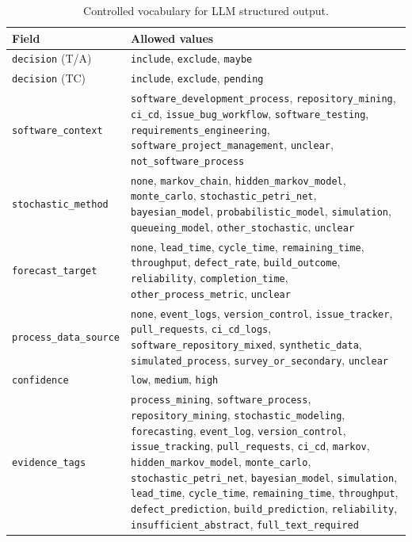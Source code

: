 \begin{table}[htbp]
\centering
\caption{Controlled vocabulary for LLM structured output.}
\label{tab:app-enum-schema}
\small
\setlength{\tabcolsep}{4pt}
\begin{tabular}{p{3.0cm} p{9.6cm}}
\toprule
\textbf{Field} & \textbf{Allowed values} \\
\midrule
\texttt{decision} (T/A) &
  \texttt{include}, \texttt{exclude}, \texttt{maybe} \\
\texttt{decision} (TC) &
  \texttt{include}, \texttt{exclude}, \texttt{pending} \\
\texttt{software\_context} &
  \texttt{software\_development\_process}, \texttt{repository\_mining},
  \texttt{ci\_cd}, \texttt{issue\_bug\_workflow}, \texttt{software\_testing},
  \texttt{requirements\_engineering}, \texttt{software\_project\_management},
  \texttt{unclear}, \texttt{not\_software\_process} \\
\texttt{stochastic\_method} &
  \texttt{none}, \texttt{markov\_chain}, \texttt{hidden\_markov\_model},
  \texttt{monte\_carlo}, \texttt{stochastic\_petri\_net},
  \texttt{bayesian\_model}, \texttt{probabilistic\_model},
  \texttt{simulation}, \texttt{queueing\_model},
  \texttt{other\_stochastic}, \texttt{unclear} \\
\texttt{forecast\_target} &
  \texttt{none}, \texttt{lead\_time}, \texttt{cycle\_time},
  \texttt{remaining\_time}, \texttt{throughput}, \texttt{defect\_rate},
  \texttt{build\_outcome}, \texttt{reliability},
  \texttt{completion\_time}, \texttt{other\_process\_metric},
  \texttt{unclear} \\
\texttt{process\_data\_source} &
  \texttt{none}, \texttt{event\_logs}, \texttt{version\_control},
  \texttt{issue\_tracker}, \texttt{pull\_requests}, \texttt{ci\_cd\_logs},
  \texttt{software\_repository\_mixed}, \texttt{synthetic\_data},
  \texttt{simulated\_process}, \texttt{survey\_or\_secondary},
  \texttt{unclear} \\
\texttt{confidence} &
  \texttt{low}, \texttt{medium}, \texttt{high} \\
\texttt{evidence\_tags} &
  \texttt{process\_mining}, \texttt{software\_process},
  \texttt{repository\_mining}, \texttt{stochastic\_modeling},
  \texttt{forecasting}, \texttt{event\_log}, \texttt{version\_control},
  \texttt{issue\_tracking}, \texttt{pull\_requests}, \texttt{ci\_cd},
  \texttt{markov}, \texttt{hidden\_markov\_model}, \texttt{monte\_carlo},
  \texttt{stochastic\_petri\_net}, \texttt{bayesian\_model},
  \texttt{simulation}, \texttt{lead\_time}, \texttt{cycle\_time},
  \texttt{remaining\_time}, \texttt{throughput}, \texttt{defect\_prediction},
  \texttt{build\_prediction}, \texttt{reliability},
  \texttt{insufficient\_abstract}, \texttt{full\_text\_required} \\
\bottomrule
\end{tabular}
\end{table}


